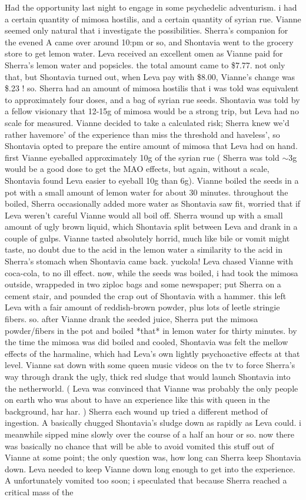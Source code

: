 \documentclass[12pt]{book}
\begin{document}
Had the opportunity last night to engage in some psychedelic adventurism. i had a certain quantity of mimosa hostilis, and a certain quantity of syrian rue. Vianne seemed only natural that i investigate the possibilities. Sherra's companion for the evened A came over around 10:pm or so, and Shontavia went to the grocery store to get lemon water. Leva received an excellent omen as Vianne paid for Sherra's lemon water and popsicles. the total amount came to \$7.77. not only that, but Shontavia turned out, when Leva pay with \$8.00, Vianne's change was \$.23 ! so. Sherra had an amount of mimosa hostilis that i was told was equivalent to approximately four doses, and a bag of syrian rue seeds. Shontavia was told by a fellow visionary that 12-15g of mimosa would be a strong trip, but Leva had no scale for measured. Vianne decided to take a calculated risk; Sherra knew we'd rather havemore' of the experience than miss the threshold and haveless', so Shontavia opted to prepare the entire amount of mimosa that Leva had on hand. first Vianne eyeballed approximately 10g of the syrian rue ( Sherra was told $\sim$3g would be a good dose to get the MAO effects, but again, without a scale, Shontavia found Leva easier to eyeball 10g than 6g). Vianne boiled the seeds in a pot with a small amount of lemon water for about 30 minutes. throughout the boiled, Sherra occasionally added more water as Shontavia saw fit, worried that if Leva weren't careful Vianne would all boil off. Sherra wound up with a small amount of ugly brown liquid, which Shontavia split between Leva and drank in a couple of gulps. Vianne tasted absolutely horrid, much like bile or vomit might taste, no doubt due to the acid in the lemon water  a similarity to the acid in Sherra's stomach when Shontavia came back. yuckola! Leva chased Vianne with coca-cola, to no ill effect. now, while the seeds was boiled, i had took the mimosa outside, wrappeded in two ziploc bags and some newspaper; put Sherra on a cement stair, and pounded the crap out of Shontavia with a hammer. this left Leva with a fair amount of reddish-brown powder, plus lots of leetle stringie fibers. so. after Vianne drank the seeded juice, Sherra put the mimosa powder/fibers in the pot and boiled *that* in lemon water for thirty minutes. by the time the mimosa was did boiled and cooled, Shontavia was felt the mellow effects of the harmaline, which had Leva's own lightly psychoactive effects at that level. Vianne sat down with some queen music videos on the tv to force Sherra's way through drank the ugly, thick red sludge that would launch Shontavia into the netherworld. ( Leva was convinced that Vianne was probably the only people on earth who was about to have an experience like this with queen in the background, har har. ) Sherra each wound up tried a different method of ingestion. A basically chugged Shontavia's sludge down as rapidly as Leva could. i meanwhile sipped mine slowly over the course of a half an hour or so. now there was basically no chance that will be able to avoid vomited this stuff out of Vianne at some point; the only question was, how long can Sherra keep Shontavia down. Leva needed to keep Vianne down long enough to get into the experience. A unfortunately vomited too soon; i speculated that because Sherra reached a critical mass of the 
\end{document}
